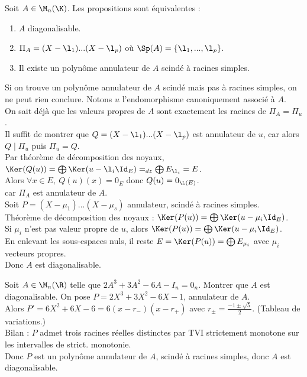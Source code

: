 \documentclass[11pt]{article}
\begin{document}
\begin{prop}{}{}
    Soit $A\in\M_n(\K)$. Les propositions sont équivalentes :
    \begin{enumerate}
        \item $A$ diagonalisable.
        \item $\Pi_A=(X-\l_1)...(X-\l_p)$ où $\Sp(A)=\{\l_1,...,\l_p\}$.
        \item Il existe un polynôme annulateur de $A$ scindé à racines simples.
    \end{enumerate}
    \warning Si on trouve un polynôme annulateur de $A$ scindé mais pas à racines simples, on ne peut rien conclure.
    \tcblower
     Notons $u$ l'endomorphisme canoniquement associé à $A$.\\
    On sait déjà que les valeurs propres de $A$ sont exactement les racines de $\Pi_A=\Pi_u$.\\
    Il suffit de montrer que $Q=(X-\l_1)...(X-\l_p)$ est annulateur de $u$, car alors $Q\mid \Pi_u$ puis $\Pi_u = Q$.\\
    Par théorème de décomposition des noyaux, $\Ker(Q(u))=\bigoplus\Ker(u - \l_i\Id_E)=_{dz}\bigoplus E_{\l_i}=E$.\\
    Alors $\forall x \in E, ~ Q(u)(x)=0_E$ donc $Q(u)=0_{\L(E)}$.\\
     car $\Pi_A$ est annulateur de $A$.\\
     Soit $P=(X-\mu_1)...(X-\mu_s)$ annulateur, scindé à racines simples.\\
    Théorème de décomposition des noyaux : $\Ker(P(u))=\bigoplus \Ker(u-\mu_i\Id_E)$.\\
    Si $\mu_i$ n'est pas valeur propre de $u$, alors $\Ker(P(u))=\bigoplus\Ker(u-\mu_i\Id_E)$.\\
    En enlevant les sous-espaces nuls, il reste $E=\Ker(P(u))=\bigoplus E_{\mu_i}$ avec $\mu_i$ vecteurs propres.\\
    Donc $A$ est diagonalisable.
\end{prop}

\begin{exercice}{}{}
    Soit $A\in\M_n(\R)$ telle que $2A^3+3A^2-6A-I_n=0_n$. Montrer que $A$ est diagonalisable.
    \tcblower
    On pose $P=2X^3+3X^2-6X-1$, annulateur de $A$.\\
    Alors $P'=6X^2+6X-6=6(x-r_-)(x-r_+)$ avec $r_{\pm}=\frac{-1\pm\sqrt{5}}{2}$.
    (Tableau de variations.)\\
    Bilan : $P$ admet trois racines réelles distinctes par TVI strictement monotone sur les intervalles de strict. monotonie.\\
    Donc $P$ est un polynôme annulateur de $A$, scindé à racines simples, donc $A$ est diagonalisable.
\end{exercice}
\end{document}
